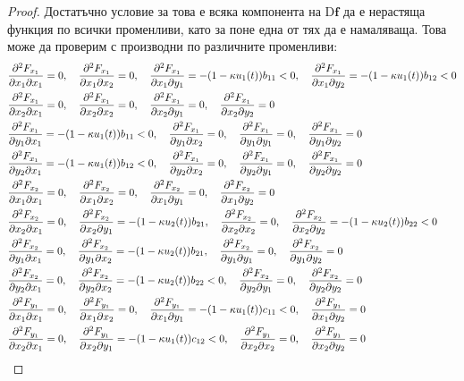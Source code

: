 \begin{proof}
Достатъчно условие за това е всяка компонента на $\mathrm{D}\mathbf{f}$ да е нерастяща функция по всички променливи, като за поне една от тях да е намаляваща. Това може да проверим с производни по различните променливи:
{\allowdisplaybreaks
  \begin{align*}
    &\pdv{F_{x_1}}{x_1}{x_1} = 0, \quad
    \pdv{F_{x_1}}{x_1}{x_2} = 0, \quad
    \pdv{F_{x_1}}{x_1}{y_1} = -(1-\kappa u_1(t)) b_{11} < 0, \quad
    \pdv{F_{x_1}}{x_1}{y_2} = -(1-\kappa u_1(t)) b_{12} < 0 \\
    &\pdv{F_{x_1}}{x_2}{x_1} = 0, \quad
    \pdv{F_{x_1}}{x_2}{x_2} = 0, \quad
    \pdv{F_{x_1}}{x_2}{y_1} = 0, \quad
    \pdv{F_{x_1}}{x_2}{y_2} = 0 \\
    &\pdv{F_{x_1}}{y_1}{x_1} = -(1-\kappa u_1(t)) b_{11} < 0, \quad
    \pdv{F_{x_1}}{y_1}{x_2} = 0, \quad
    \pdv{F_{x_1}}{y_1}{y_1} = 0, \quad
    \pdv{F_{x_1}}{y_1}{y_2} = 0 \\
    &\pdv{F_{x_1}}{y_2}{x_1} = -(1-\kappa u_1(t)) b_{12} < 0, \quad
    \pdv{F_{x_1}}{y_2}{x_2} = 0, \quad
    \pdv{F_{x_1}}{y_2}{y_1} = 0, \quad
    \pdv{F_{x_1}}{y_2}{y_2} = 0 \\
    &\pdv{F_{x_2}}{x_1}{x_1} = 0, \quad
    \pdv{F_{x_2}}{x_1}{x_2} = 0, \quad
    \pdv{F_{x_2}}{x_1}{y_1} = 0, \quad
    \pdv{F_{x_2}}{x_1}{y_2} = 0 \\
    &\pdv{F_{x_2}}{x_2}{x_1} = 0, \quad
    \pdv{F_{x_2}}{x_2}{y_1} = -(1-\kappa u_2(t)) b_{21}, \quad
    \pdv{F_{x_2}}{x_2}{x_2} = 0, \quad
    \pdv{F_{x_2}}{x_2}{y_2} = -(1-\kappa u_2(t)) b_{22} < 0 \\
    &\pdv{F_{x_2}}{y_1}{x_1} = 0, \quad
    \pdv{F_{x_2}}{y_1}{x_2} = -(1-\kappa u_2(t)) b_{21}, \quad
    \pdv{F_{x_2}}{y_1}{y_1} = 0, \quad
    \pdv{F_{x_2}}{y_1}{y_2} = 0 \\
    &\pdv{F_{x_2}}{y_2}{x_1} = 0, \quad
    \pdv{F_{x_2}}{y_2}{x_2} = -(1-\kappa u_2(t)) b_{22} < 0, \quad
    \pdv{F_{x_2}}{y_2}{y_1} = 0, \quad
    \pdv{F_{x_2}}{y_2}{y_2} = 0 \\
    &\pdv{F_{y_1}}{x_1}{x_1} = 0, \quad
    \pdv{F_{y_1}}{x_1}{x_2} = 0, \quad
    \pdv{F_{y_1}}{x_1}{y_1} = -(1-\kappa u_1(t))c_{11} < 0, \quad
    \pdv{F_{y_1}}{x_1}{y_2} = 0 \\
    &\pdv{F_{y_1}}{x_2}{x_1} = 0, \quad
    \pdv{F_{y_1}}{x_2}{y_1} = -(1-\kappa u_1(t))c_{12} < 0, \quad
    \pdv{F_{y_1}}{x_2}{x_2} = 0, \quad
    \pdv{F_{y_1}}{x_2}{y_2} = 0 \\

\end{align*}}
\end{proof}
